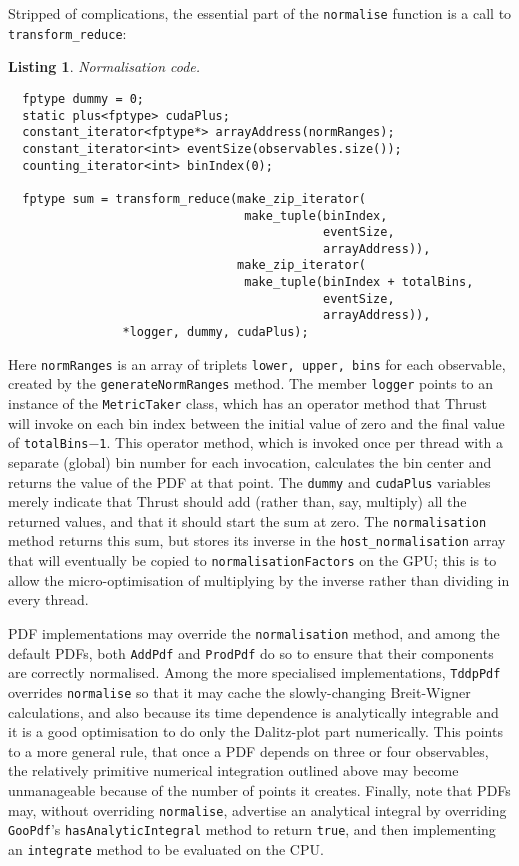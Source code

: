 \documentclass[12pt,pdflatex]{article}
\newtheorem{listing}{Listing}
\begin{document}
Stripped of complications, the essential part of the \texttt{normalise} function
is a call to \texttt{transform\_reduce}:
\begin{listing}
\label{listing:normalisation}
Normalisation code.

\begin{verbatim}
  fptype dummy = 0; 
  static plus<fptype> cudaPlus;
  constant_iterator<fptype*> arrayAddress(normRanges); 
  constant_iterator<int> eventSize(observables.size());
  counting_iterator<int> binIndex(0); 

  fptype sum = transform_reduce(make_zip_iterator(
                                 make_tuple(binIndex, 
                                            eventSize, 
                                            arrayAddress)),
                                make_zip_iterator(
                                 make_tuple(binIndex + totalBins, 
                                            eventSize, 
                                            arrayAddress)),
				*logger, dummy, cudaPlus); 
\end{verbatim}
\end{listing}
Here \texttt{normRanges} is an array of triplets \verb|lower, upper, bins| for each observable, created
by the \texttt{generateNormRanges} method. The member \texttt{logger} points to an instance of the
\texttt{MetricTaker} class, which has an operator method that Thrust will invoke on each bin index between
the initial value of zero and the final value of \texttt{totalBins$-$1}. This operator method, which is invoked once per
thread with a separate (global) bin number for each invocation, calculates
the bin center and returns the value of the PDF at that point.
The \texttt{dummy} and \texttt{cudaPlus} variables
merely indicate that Thrust should add (rather than, say, multiply) all the returned
values, and that it should start the sum at zero. The \texttt{normalisation} method
returns this sum, but stores its inverse in the \texttt{host\_normalisation} array
that will eventually be copied to \texttt{normalisationFactors} on the GPU; this is to allow the micro-optimisation of 
multiplying by the inverse rather than dividing in every thread. 

PDF implementations may override the \texttt{normalisation} method, and among the default
PDFs, both \texttt{AddPdf} and \texttt{ProdPdf} do so to
ensure that their components are correctly normalised. Among the more specialised
implementations, \texttt{TddpPdf} overrides \texttt{normalise} so that
it may cache the slowly-changing Breit-Wigner calculations, and also because its time dependence
is analytically integrable and it is a good optimisation to do only the Dalitz-plot
part numerically. This points to a more general rule, that once a PDF depends on three
or four observables, the relatively primitive numerical integration outlined above may
become unmanageable because of the number of points it creates. Finally, note that PDFs
may, without overriding \texttt{normalise}, advertise an analytical integral by overriding
\texttt{GooPdf}'s \texttt{hasAnalyticIntegral} method to return \texttt{true}, 
and then implementing an \texttt{integrate} method to be evaluated on the CPU. 
\end{document}
